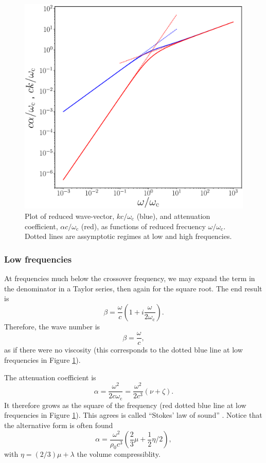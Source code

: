 \begin{figure}
  \centering
  \begin{minipage}{0.7\textwidth}
      \includegraphics[width=\textwidth]{figures/sound_wave_att}
  \end{minipage}
  \caption{Plot of reduced wave-vector, $k c /\omega_\mathrm{c}$ (blue), and
    attenuation coefficient, $\alpha c /\omega_\mathrm{c}$ (red), as functions
    of reduced frecuency $\omega /\omega_\mathrm{c}$. Dotted lines are
    assymptotic regimes at low and high frequencies.
    \label{fig:sound_wave_att}}
\end{figure}


\subsubsection{Low frequencies}


At frequencies much below the crossover frequency, we may expand the
term in the denominator in a Taylor series, then again for the square
root. The end result is
\[
\beta = \frac{\omega}{c} \left(1 + i   \frac{\omega}{2 \omega_\mathrm{c}}\right).
\]
%
Therefore, the wave number is
\[
\beta = \frac{\omega}{c},
\]
as if there were no viscosity (this corresponds to the dotted blue
line at low frequencies in Figure \ref{fig:sound_wave_att}).

The attenuation coefficient is
\[ \alpha = \frac{\omega^2}{2 c\omega_\mathrm{c}}=
\frac{\omega^2}{2 c^3}(\nu+\zeta). \]
%
It therefore grows as the square of the frequency (red dotted blue
line at low frequencies in Figure \ref{fig:sound_wave_att}).  This
agrees is called ``Stokes' law of sound'' . Notice that the alternative form is often found
\cite{kp:SloS}
\[
  \alpha =  \frac{\omega^2}{\rho_0 c^3}
  \left( \frac23 \mu+ \frac12 \eta /2 \right),
\]
with $\eta= (2/3) \mu + \lambda$ the volume compressiblity.

